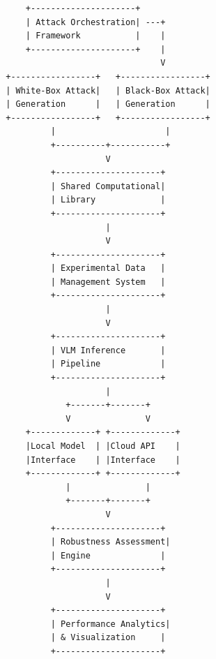 \begin{verbatim}
                  +---------------------+
                  | Attack Orchestration| ---+
                  | Framework           |    |
                  +---------------------+    |
                                             V
              +-----------------+   +-----------------+
              | White-Box Attack|   | Black-Box Attack|
              | Generation      |   | Generation      |
              +-----------------+   +-----------------+
                       |                      |
                       +----------+-----------+
                                  V
                       +---------------------+
                       | Shared Computational|
                       | Library             |
                       +---------------------+
                                  |
                                  V
                       +---------------------+
                       | Experimental Data   |
                       | Management System   |
                       +---------------------+
                                  |
                                  V
                       +---------------------+
                       | VLM Inference       |
                       | Pipeline            |
                       +---------------------+
                                  |
                          +-------+-------+
                          V               V
                  +-------------+ +-------------+
                  |Local Model  | |Cloud API    |
                  |Interface    | |Interface    |
                  +-------------+ +-------------+
                          |               |
                          +-------+-------+
                                  V
                       +---------------------+
                       | Robustness Assessment|
                       | Engine              |
                       +---------------------+
                                  |
                                  V
                       +---------------------+
                       | Performance Analytics|
                       | & Visualization     |
                       +---------------------+
\end{verbatim}

